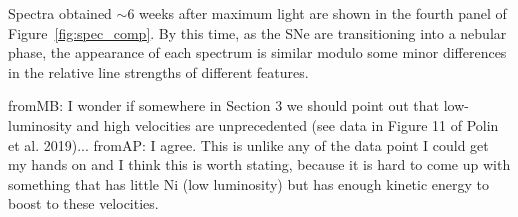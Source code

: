 \documentclass[twocolumn]{aastex63}
\newcommand{\frommb}[1]{{\color{purple} fromMB: {#1}}}
\newcommand{\fromabi}[1]{{\color{teal} fromAP: {#1}}}
\begin{document}
Spectra obtained $\sim$6 weeks after maximum light are shown in the fourth
panel of Figure~\ref{fig:spec_comp}. By this time, as the SNe are
transitioning into a nebular phase, the appearance of each spectrum is similar
modulo some minor differences in the relative line strengths of different
features.

\frommb{I wonder if somewhere in Section 3 we should point out that
low-luminosity and high velocities are unprecedented (see data in Figure 11 of
Polin et al. 2019)...} \fromabi{I agree. This is unlike any of the data point
I could get my hands on and I think this is worth stating, because it is hard
to come up with something that has little Ni (low luminosity) but has enough
kinetic energy to boost to these velocities.}

\end{document}
